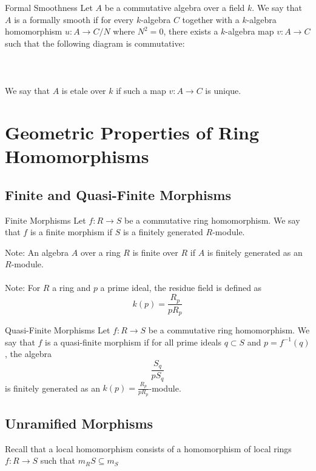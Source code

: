 \documentclass[a4paper]{article}
\begin{document}
\begin{defn}{Formal Smoothness}{} Let $A$ be a commutative algebra over a field $k$. We say that $A$ is a formally smooth if for every $k$-algebra $C$ together with a $k$-algebra homomorphism $u:A\to C/N$ where $N^2=0$, there exists a $k$-algebra map $v:A\to C$ such that the following diagram is commutative:  \\~\\
\\~\\
We say that $A$ is etale over $k$ if such a map $v:A\to C$ is unique. 
\end{defn}

\pagebreak
\section{Geometric Properties of Ring Homomorphisms}
\subsection{Finite and Quasi-Finite Morphisms}
\begin{defn}{Finite Morphisms}{} Let $f:R\to S$ be a commutative ring homomorphism. We say that $f$ is a finite morphism if $S$ is a finitely generated $R$-module. 
\end{defn}

Note: An algebra $A$ over a ring $R$ is finite over $R$ if $A$ is finitely generated as an $R$-module. \\~\\

Note: For $R$ a ring and $p$ a prime ideal, the residue field is defined as $$k(p)=\frac{R_p}{pR_p}$$

\begin{defn}{Quasi-Finite Morphisms}{} Let $f:R\to S$ be a commutative ring homomorphism. We say that $f$ is a quasi-finite morphism if for all prime ideals $q\subset S$ and $p=f^{-1}(q)$, the algebra $$\frac{S_q}{pS_q}$$ is finitely generated as an $k(p)=\frac{R_p}{pR_p}$-module. 
\end{defn}

\subsection{Unramified Morphisms}
Recall that a local homomorphism consists of a homomorphism of local rings $f:R\to S$ such that $m_RS\subseteq m_S$
\end{document}
